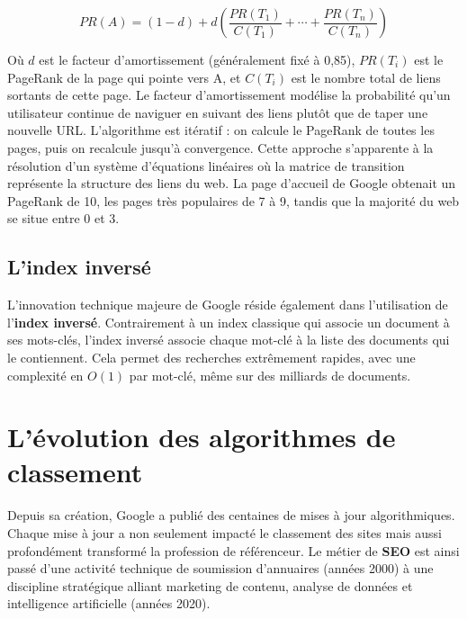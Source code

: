\documentclass[12pt,a4paper,twoside]{report}
\newcommand{\keyword}[1]{\textbf{\textcolor{googleblue}{#1}}}
\begin{document}
\[
PR(A) = (1-d) + d \left( \frac{PR(T_1)}{C(T_1)} + \cdots + \frac{PR(T_n)}{C(T_n)} \right)
\]

Où \(d\) est le facteur d'amortissement (généralement fixé à 0,85), \(PR(T_i)\) est le PageRank de la page qui pointe vers A, et \(C(T_i)\) est le nombre total de liens sortants de cette page. Le facteur d'amortissement modélise la probabilité qu'un utilisateur continue de naviguer en suivant des liens plutôt que de taper une nouvelle URL. L'algorithme est itératif : on calcule le PageRank de toutes les pages, puis on recalcule jusqu'à convergence. Cette approche s'apparente à la résolution d'un système d'équations linéaires où la matrice de transition représente la structure des liens du web. La page d'accueil de Google obtenait un PageRank de 10, les pages très populaires de 7 à 9, tandis que la majorité du web se situe entre 0 et 3.

\subsection{L'index inversé}

L'innovation technique majeure de Google réside également dans l'utilisation de l'\keyword{index inversé}. Contrairement à un index classique qui associe un document à ses mots-clés, l'index inversé associe chaque mot-clé à la liste des documents qui le contiennent. Cela permet des recherches extrêmement rapides, avec une complexité en \(O(1)\) par mot-clé, même sur des milliards de documents.

\section{L'évolution des algorithmes de classement}

Depuis sa création, Google a publié des centaines de mises à jour algorithmiques. Chaque mise à jour a non seulement impacté le classement des sites mais aussi profondément transformé la profession de référenceur. Le métier de \keyword{SEO} est ainsi passé d'une activité technique de soumission d'annuaires (années 2000) à une discipline stratégique alliant marketing de contenu, analyse de données et intelligence artificielle (années 2020).
\end{document}
